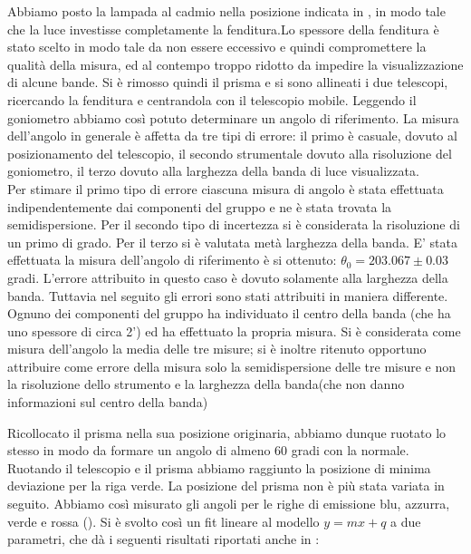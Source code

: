Abbiamo posto la lampada al cadmio nella posizione indicata in , in modo tale che la luce investisse completamente la fenditura.Lo spessore della fenditura è stato scelto in modo tale da non essere eccessivo e quindi compromettere la qualità della misura, ed al contempo troppo ridotto da impedire la visualizzazione di alcune bande. \newline
 Si è rimosso quindi il prisma e si sono allineati i due telescopi, ricercando la fenditura e centrandola con il telescopio mobile. Leggendo il goniometro abbiamo così potuto determinare un angolo di riferimento. \newline
  La misura dell'angolo in generale è affetta da tre tipi di errore: il primo è casuale, dovuto al posizionamento del telescopio, il secondo strumentale dovuto alla  risoluzione del goniometro, il terzo dovuto alla larghezza della banda di luce visualizzata. \\
Per stimare il primo tipo di errore ciascuna misura di angolo è stata effettuata indipendentemente dai componenti del gruppo e ne è stata trovata la semidispersione. Per il secondo tipo di incertezza si è considerata la risoluzione di un primo di grado. Per il terzo si è valutata metà larghezza della banda. \newline
 E' stata effettuata la misura dell'angolo di riferimento è si ottenuto: $\theta_{0}=203.067 \pm 0.03$ gradi. L'errore attribuito in questo caso è dovuto solamente alla larghezza della banda. Tuttavia nel seguito gli errori sono stati attribuiti in maniera differente. Ognuno dei componenti del gruppo ha individuato il centro della banda (che ha uno spessore di circa 2') ed ha effettuato la propria misura. Si è  considerata come misura dell'angolo la media delle tre misure; si è inoltre ritenuto opportuno attribuire come errore della misura solo la semidispersione delle tre misure e non la risoluzione dello strumento e la larghezza della banda(che non danno informazioni sul centro della banda)  \newline
 
Ricollocato il prisma nella sua posizione originaria, abbiamo dunque ruotato lo stesso in modo da formare un angolo di almeno 60 gradi con la normale. Ruotando il telescopio e il prisma abbiamo raggiunto la posizione di minima deviazione per la riga verde. La posizione del prisma non è più stata variata in seguito. Abbiamo così misurato gli angoli per le righe di emissione blu, azzurra, verde e rossa (). Si è svolto così un fit lineare al modello $y=mx+q$ a due parametri, che dà i seguenti risultati riportati anche in :


